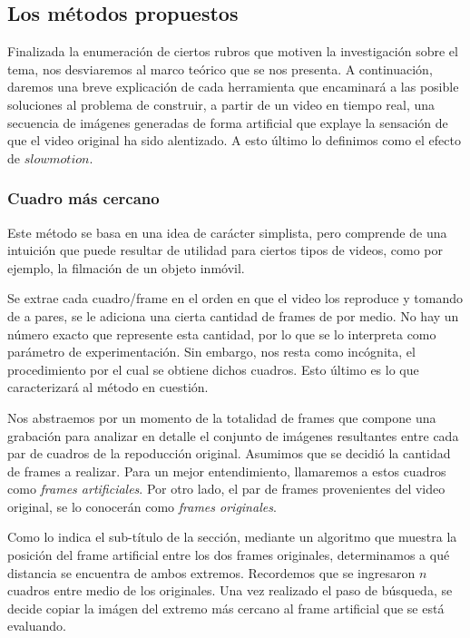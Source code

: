 \subsection{Los m\'etodos propuestos}

Finalizada la enumeraci\'on de ciertos rubros que motiven la investigaci\'on sobre el tema, nos desviaremos al marco te\'orico que se nos presenta. A continuaci\'on, daremos una breve explicaci\'on de cada herramienta que encaminar\'a a las posible soluciones al problema de construir, a partir de un video en tiempo real, una secuencia de im\'agenes generadas de forma artificial que explaye la sensaci\'on de que el video original ha sido alentizado. A esto \'ultimo lo definimos como el efecto de $slowmotion$.

\subsubsection{Cuadro m\'as cercano}

Este m\'etodo se basa en una idea de car\'acter simplista, pero comprende de una intuici\'on que puede resultar de utilidad para ciertos tipos de videos, como por ejemplo, la filmaci\'on de un objeto inm\'ovil.

Se extrae cada cuadro/frame en el orden en que el video los reproduce y tomando de a pares, se le adiciona una cierta cantidad de frames de por medio. No hay un n\'umero exacto que represente esta cantidad, por lo que se lo interpreta como par\'ametro de experimentaci\'on. Sin embargo, nos resta como inc\'ognita, el procedimiento por el cual se obtiene dichos cuadros. Esto \'ultimo es lo que caracterizar\'a al m\'etodo en cuesti\'on.

Nos abstraemos por un momento de la totalidad de frames que compone una grabaci\'on para analizar en detalle el conjunto de im\'agenes resultantes entre cada par de cuadros de la repoducci\'on original. Asumimos que se decidi\'o la cantidad de frames a realizar. Para un mejor entendimiento, llamaremos a estos cuadros como \textit{frames artificiales}. Por otro lado, el par de frames provenientes del video original, se lo conocer\'an como \textit{frames originales}.

Como lo indica el sub-t\'itulo de la secci\'on, mediante un algoritmo que muestra la posici\'on del frame artificial entre los dos frames originales, determinamos a qu\'e distancia se encuentra de ambos extremos. Recordemos que se ingresaron $n$ cuadros entre medio de los originales. Una vez realizado el paso de b\'usqueda, se decide copiar la im\'agen del extremo m\'as cercano al frame artificial que se est\'a evaluando. 

